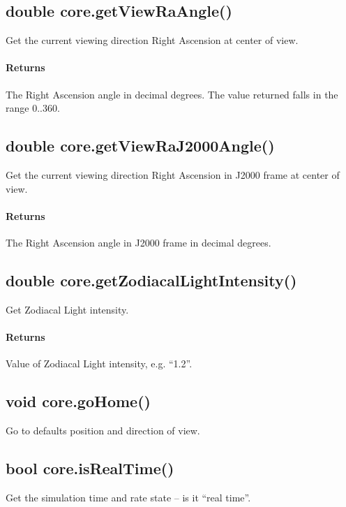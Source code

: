 \subsection{double core.getViewRaAngle()}
\label{sec:ScriptingAPI:core:getViewRaAngle}
Get the current viewing direction Right Ascension at center of view.

\paragraph{Returns}
The Right Ascension angle in decimal degrees. The value returned falls in the range 0..360.

\subsection{double core.getViewRaJ2000Angle()}
\label{sec:ScriptingAPI:core:getViewRaJ2000Angle}
Get the current viewing direction Right Ascension in J2000 frame at center of view.

\paragraph{Returns}
The Right Ascension angle in J2000 frame in decimal degrees.

\subsection{double core.getZodiacalLightIntensity()}
\label{sec:ScriptingAPI:core:getZodiacalLightIntensity}
Get Zodiacal Light intensity.

\paragraph{Returns}
Value of Zodiacal Light intensity, e.g. ``1.2''.

\subsection{void core.goHome()}
\label{sec:ScriptingAPI:core:goHome}
Go to defaults position and direction of view.

\subsection{bool core.isRealTime()}
\label{sec:ScriptingAPI:core:isRealTime}
Get the simulation time and rate state -- is it ``real time''.

